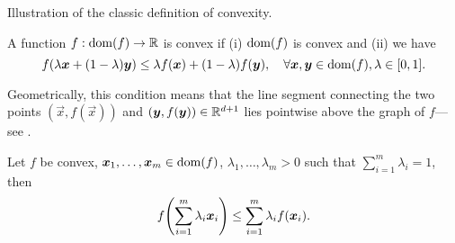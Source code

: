 \begin{marginfigure}
    \centering
    \caption{Illustration of the classic definition of convexity.}
    \label{fig:convexity}
\end{marginfigure}

\begin{definition}[Convexity]
    A function $f: \mathrm{dom}(f) \to \mathbb{R}$ is convex if (i) $\mathrm{dom}(f)$ is convex and (ii) we have \[
        f(\lambda \bm{x} + (1-\lambda) \bm{y}) \leq \lambda f(\bm{x}) + (1-\lambda) f(\bm{y}), \quad \forall \bm{x}, \bm{y} \in \mathrm{dom}(f), \lambda\in[0,1].
    \]
\end{definition}

Geometrically, this condition means that the line segment connecting the two points
$(\vec{x},f(\vec{x}))$ and $(\bm{y},f(\bm{y})) \in \mathbb{R}^{d+1}$ lies pointwise above the graph of
$f$---see .

%
%

\begin{lemma}
    Let $f$ be convex, $\bm{x}_1,\ldots,\bm{x}_m\in\mathrm{dom}(f)$, $\lambda_1,\ldots,\lambda_m > 0$ such that $\sum_{i=1}^m \lambda_i = 1$, then \[
        f \lft( \sum_{i=1}^m \lambda_i \vec{x}_i \rgt) \leq \sum_{i=1}^{m} \lambda_i f(\vec{x}_i).
    \]
\end{lemma}

